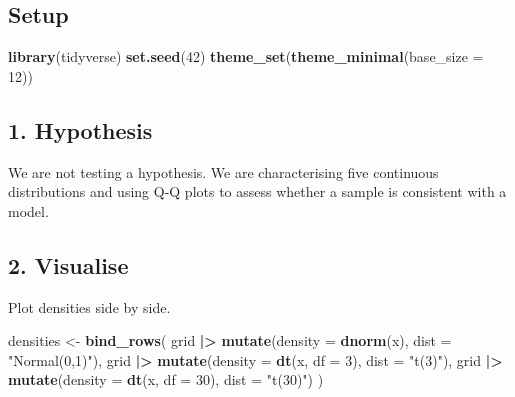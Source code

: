 \documentclass[
]{article}
\newenvironment{Shaded}{\begin{snugshade}}{\end{snugshade}}
\newcommand{\AttributeTok}[1]{\textcolor[rgb]{0.13,0.29,0.53}{#1}}
\newcommand{\DecValTok}[1]{\textcolor[rgb]{0.00,0.00,0.81}{#1}}
\newcommand{\FunctionTok}[1]{\textcolor[rgb]{0.13,0.29,0.53}{\textbf{#1}}}
\newcommand{\NormalTok}[1]{#1}
\newcommand{\OtherTok}[1]{\textcolor[rgb]{0.56,0.35,0.01}{#1}}
\newcommand{\SpecialCharTok}[1]{\textcolor[rgb]{0.81,0.36,0.00}{\textbf{#1}}}
\newcommand{\StringTok}[1]{\textcolor[rgb]{0.31,0.60,0.02}{#1}}
\begin{document}
\subsection{Setup}\label{setup}

\begin{Shaded}
\begin{Highlighting}[]
\FunctionTok{library}\NormalTok{(tidyverse)}
\FunctionTok{set.seed}\NormalTok{(}\DecValTok{42}\NormalTok{)}
\FunctionTok{theme\_set}\NormalTok{(}\FunctionTok{theme\_minimal}\NormalTok{(}\AttributeTok{base\_size =} \DecValTok{12}\NormalTok{))}
\end{Highlighting}
\end{Shaded}

\subsection{1. Hypothesis}\label{hypothesis}

We are not testing a hypothesis. We are characterising five continuous
distributions and using Q-Q plots to assess whether a sample is
consistent with a model.

\subsection{2. Visualise}\label{visualise}

Plot densities side by side.

\begin{Shaded}
\begin{Highlighting}[]

\NormalTok{densities }\OtherTok{\textless{}{-}} \FunctionTok{bind\_rows}\NormalTok{(}
\NormalTok{  grid }\SpecialCharTok{|\textgreater{}} \FunctionTok{mutate}\NormalTok{(}\AttributeTok{density =} \FunctionTok{dnorm}\NormalTok{(x),         }\AttributeTok{dist =} \StringTok{"Normal(0,1)"}\NormalTok{),}
\NormalTok{  grid }\SpecialCharTok{|\textgreater{}} \FunctionTok{mutate}\NormalTok{(}\AttributeTok{density =} \FunctionTok{dt}\NormalTok{(x, }\AttributeTok{df =} \DecValTok{3}\NormalTok{),    }\AttributeTok{dist =} \StringTok{"t(3)"}\NormalTok{),}
\NormalTok{  grid }\SpecialCharTok{|\textgreater{}} \FunctionTok{mutate}\NormalTok{(}\AttributeTok{density =} \FunctionTok{dt}\NormalTok{(x, }\AttributeTok{df =} \DecValTok{30}\NormalTok{),   }\AttributeTok{dist =} \StringTok{"t(30)"}\NormalTok{)}
\NormalTok{)}
\end{Highlighting}
\end{Shaded}
\end{document}
